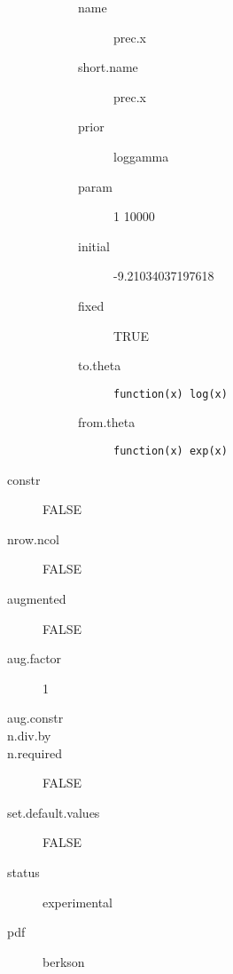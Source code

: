 \begin{description}
\begin{description}
\begin{description}
	 	 	 \item[ name ] prec.x 
	 	 	 \item[ short.name ] prec.x 
	 	 	 \item[ prior ] loggamma 
	 	 	 \item[ param ] 1 10000 
	 	 	 \item[ initial ] -9.21034037197618 
	 	 	 \item[ fixed ] TRUE 
	 	 	 \item[ to.theta ] \verb|function(x) log(x)| 
	 	 	 \item[ from.theta ] \verb|function(x) exp(x)| 
	 	 \end{description}
	 \end{description}
	 \item[ constr ] FALSE 
	 \item[ nrow.ncol ] FALSE 
	 \item[ augmented ] FALSE 
	 \item[ aug.factor ] 1 
	 \item[ aug.constr ]  
	 \item[ n.div.by ]  
	 \item[ n.required ] FALSE 
	 \item[ set.default.values ] FALSE 
	 \item[ status ] experimental 
	 \item[ pdf ] berkson 
\end{description}
